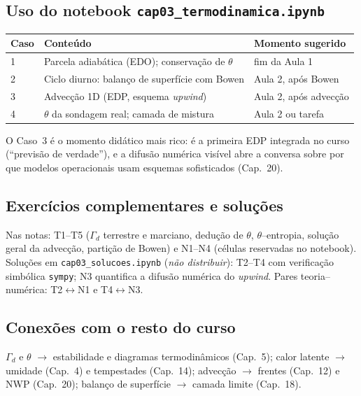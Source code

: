 \subsection*{Uso do notebook \texttt{cap03\_termodinamica.ipynb}}

\begin{center}
\begin{tabular}{lll}
\hline
Caso & Conteúdo & Momento sugerido \\
\hline
1 & Parcela adiabática (EDO); conservação de $\theta$ & fim da Aula 1 \\
2 & Ciclo diurno: balanço de superfície com Bowen & Aula 2, após Bowen \\
3 & Advecção 1D (EDP, esquema \emph{upwind}) & Aula 2, após advecção \\
4 & $\theta$ da sondagem real; camada de mistura & Aula 2 ou tarefa \\
\hline
\end{tabular}
\end{center}

O Caso~3 é o momento didático mais rico: é a primeira EDP integrada no
curso (``previsão de verdade''), e a difusão numérica visível abre a
conversa sobre por que modelos operacionais usam esquemas sofisticados
(Cap.~20).

\subsection*{Exercícios complementares e soluções}

Nas notas: T1--T5 ($\Gamma_d$ terrestre e marciano, dedução de $\theta$,
$\theta$--entropia, solução geral da advecção, partição de Bowen) e N1--N4
(células reservadas no notebook). Soluções em
\texttt{cap03\_solucoes.ipynb} (\emph{não distribuir}): T2--T4 com
verificação simbólica \texttt{sympy}; N3 quantifica a difusão numérica do
\emph{upwind}. Pares teoria--numérica: T2$\leftrightarrow$N1 e
T4$\leftrightarrow$N3.

\subsection*{Conexões com o resto do curso}

$\Gamma_d$ e $\theta$ $\to$ estabilidade e diagramas termodinâmicos
(Cap.~5); calor latente $\to$ umidade (Cap.~4) e tempestades (Cap.~14);
advecção $\to$ frentes (Cap.~12) e NWP (Cap.~20); balanço de superfície
$\to$ camada limite (Cap.~18).
